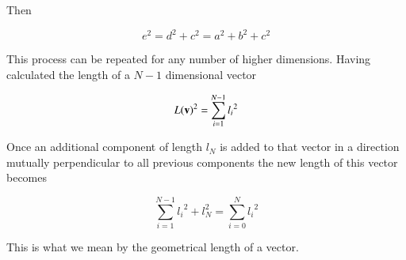 \documentclass{article}      %
\begin{document}
Then

\[
e^2 = d^2 + c^2 = a^2 + b^2 + c^2
\]

This process can be repeated for any number of higher dimensions.  Having calculated the length of a $N-1$ dimensional vector

\[
{L(\mathbf{v})}^2 = \sum_{i=1}^{N-1} {{l_i}^2}
\]

Once an additional component of length $l_N$ is added to that vector in a direction mutually perpendicular to all previous components the new length of this vector becomes

\[
\sum_{i=1}^{N-1} {{l_i}^2} + l_N^2 = \sum_{i=0}^{N} {{l_i}^2}
\]

This is what we mean by the geometrical length of a vector.

%
%
\end{document}
